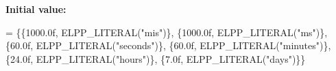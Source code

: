 {\bfseries Initial value\-:}
\begin{DoxyCode}
= \{\{1000.0f, ELPP\_LITERAL(\textcolor{stringliteral}{"mis"})\},
                        \{1000.0f, ELPP\_LITERAL(\textcolor{stringliteral}{"ms"})\},
                        \{60.0f, ELPP\_LITERAL(\textcolor{stringliteral}{"seconds"})\},
                        \{60.0f, ELPP\_LITERAL(\textcolor{stringliteral}{"minutes"})\},
                        \{24.0f, ELPP\_LITERAL(\textcolor{stringliteral}{"hours"})\},
                        \{7.0f, ELPP\_LITERAL(\textcolor{stringliteral}{"days"})\}\}
\end{DoxyCode}
